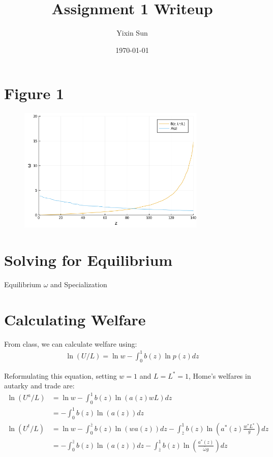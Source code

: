\documentclass[11pt]{article}
\title{\vspace{-1.5cm}Assignment 1 Writeup}
\author{Yixin Sun}
\date{\today}
\begin{document}
\maketitle

\section{Figure 1}
\begin{figure}[h]
    \centering
    \includegraphics[width=0.8\textwidth]{fig1.png}
\end{figure}

\section{Solving for Equilibrium}
\begin{table}[H]
    \centering
    \caption{Equilibrium $\omega$ and Specialization}
    
\end{table}

\section{Calculating Welfare}
From class, we can calculate welfare using:
\begin{align*}
    \ln (U / L)=\ln w-\int_{0}^{1} b(z) \ln p(z) d z
\end{align*}

Reformulating this equation, setting $w = 1$ and $L = L^* = 1$, Home's welfares in autarky and trade are:
\begin{align*}
    \ln (U^a / L) &=\ln w-\int_{0}^{1} b(z) \ln (a(z) w L) d z \\
    &= -\int_{0}^{1} b(z) \ln (a(z)) d z \\
    \ln (U^t / L) &= \ln w-\int_{0}^{\bar{z}} b(z) \ln (w a(z) ) d z-\int_{\bar{z}}^{1} b(z) \ln \left(a^{*}(z) \frac{w^{*} L^{*}}{g}\right) d z \\
    &= -\int_{0}^{\bar{z}} b(z) \ln (a(z)) d z-\int_{\bar{z}}^{1} b(z) \ln \left(\frac{a^{*}(z) }{\bar{\omega}g}\right) d z
\end{align*}
\end{document}

